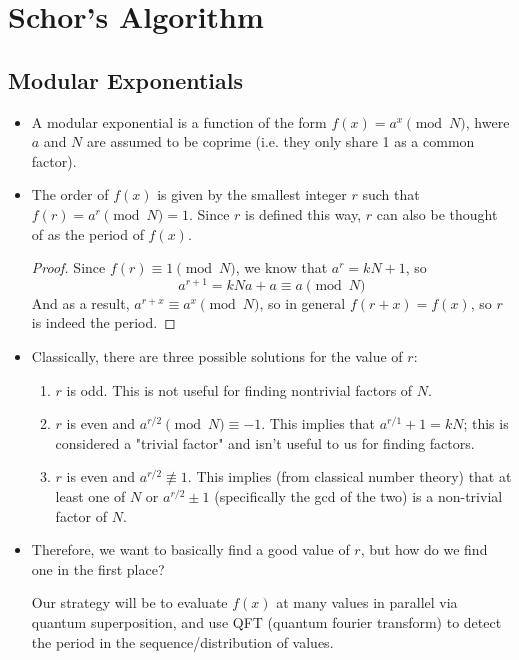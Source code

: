 \section{Schor's Algorithm}
\subsection{Modular Exponentials}
\begin{itemize}
	\item A modular exponential is a function of the form \( f(x) = a^{x }\pmod N \), hwere \( a \) and \( N \) are assumed
		to be coprime (i.e. they only share 1 as a common factor).
	\item The order of \( f(x) \) is given by the smallest integer \( r \) such that \( f(r) = a^{r}\pmod N = 1 \). 
		Since \( r \) is defined this way, \( r \) can also be thought of as the period of \( f(x) \). 

		\begin{proof}
			Since \( f(r) \equiv 1 \pmod N \), we know that \( a^{r} = kN + 1 \), so 
			\[
			a^{r + 1} = kN a + a \equiv a \pmod N
			\] 
			And as a result, \( a^{r + x} \equiv a^{x} \pmod N \), so in general \( f(r +x) = f(x) \), so 
			\( r \) is indeed the period. 
		\end{proof}
	\item Classically, there are three possible solutions for the value of \( r \): 
		\begin{enumerate}[label=\roman*)]
			\item \( r \) is odd. This is not useful for finding nontrivial factors of \( N \). 
			\item \( r \) is even and \( a^{ r / 2} \pmod N \equiv -1 \). This implies that  \( a^{r / 1} + 1 
				= kN\); this is considered a "trivial factor" and isn't useful to us for finding factors.  
			\item \( r \) is even and \( a^{r / 2} \not \equiv 1 \). This implies (from classical number theory) 
				that at least one of \( N \) or \( a^{r / 2} \pm 1 \) (specifically the gcd of the two) is a 
				non-trivial factor of  \( N \). 
		\end{enumerate}
	\item Therefore, we want to basically find a good value of \( r \), but how do we find one in the first 
		place?
		
		Our strategy will be to evaluate \( f(x) \) at many values in parallel via quantum superposition, and 
		use QFT (quantum fourier transform) to detect the period in the sequence/distribution of values.   
\end{itemize}
